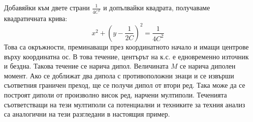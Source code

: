 Добавяйки към двете страни $\frac{1}{4 C^2}$ и допълвайки квадрата, получаваме квадратичната крива:
\begin{equation}
    x^2 + \left(y - \frac{1}{2 C}\right)^2 = \frac{1}{4 C^2}
\end{equation}
Това са окръжности, преминаващи през координатното начало и имащи центрове върху координатна ос. В това течение, центърът на к.с. е едновременно източник и бездна. Такова течение се нарича дипол.
Величината $M$ се нарича диполен момент. Ако се доближат два дипола с противоположни знаци и се извърши съответния граничен преход, ще се получи дипол от втори ред. Така може да се построят диполи от 
произволно висок ред, нарчени мултиполи. Теченията съответстващи на тези мултиполи са потенциални и техниките за техния анализ са аналогични на тези разгледани в настоящия пример.